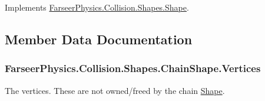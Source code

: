 Implements \hyperlink{class_farseer_physics_1_1_collision_1_1_shapes_1_1_shape_a2b93a18850e5f40fcc96f2f7744d5d2e}{Farseer\+Physics.\+Collision.\+Shapes.\+Shape}.



\subsection{Member Data Documentation}
\hypertarget{class_farseer_physics_1_1_collision_1_1_shapes_1_1_chain_shape_a5e122a3851ec154ec51873b16a190741}{
\subsubsection[{Vertices}]{ Farseer\+Physics.\+Collision.\+Shapes.\+Chain\+Shape.\+Vertices}}\label{class_farseer_physics_1_1_collision_1_1_shapes_1_1_chain_shape_a5e122a3851ec154ec51873b16a190741}


The vertices. These are not owned/freed by the chain \hyperlink{class_farseer_physics_1_1_collision_1_1_shapes_1_1_shape}{Shape}. 



